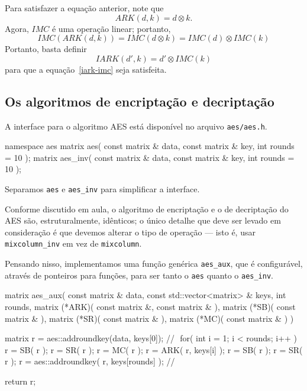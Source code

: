 \documentclass{article}
\newcommand{\xor}{\otimes}
\begin{document}
Para satisfazer a equação anterior, note que
\begin{equation*}
    ARK( d, k ) = d \xor k.
\end{equation*}
Agora, $IMC$ é uma operação linear; portanto,
\begin{equation*}
    IMC( ARK(d, k) ) = IMC( d \xor k ) = IMC(d) \xor IMC(k)
\end{equation*}
Portanto, basta definir
\begin{equation*}
    IARK( d', k ) = d' \xor IMC(k)
\end{equation*}
para que a equação~\ref{iark-imc} seja satisfeita.

\subsection{Os algoritmos de encriptação e decriptação}

A interface para o algoritmo AES está disponível no arquivo \verb"aes/aes.h".
\begin{cppcode}
    namespace aes {
        matrix aes( const matrix & data, const matrix & key, int rounds = 10 );
        matrix aes_inv( const matrix & data, const matrix & key, int rounds = 10 );
    }
\end{cppcode}

Separamos \verb"aes" e \verb"aes_inv" para simplificar a interface.

Conforme discutido em aula, o algoritmo de encriptação e o de decriptação do AES
são, estruturalmente, idênticos;
o único detalhe que deve ser levado em consideração
é que devemos alterar o tipo de operação
--- isto é, usar \verb"mixcolumn_inv" em vez de \verb"mixcolumn".

Pensando nisso,
implementamos uma função genérica \verb"aes_aux",
que é configurável, através de ponteiros para funções,
para ser tanto o \verb"aes" quanto o \verb"aes_inv".

\begin{cppcode}
    matrix aes_aux(
        const matrix & data,
        const std::vector<matrix> & keys,
        int rounds,
        matrix (*ARK)( const matrix &, const matrix & ),
        matrix (*SB)( const matrix & ),
        matrix (*SR)( const matrix & ),
        matrix (*MC)( const matrix & )
    )
    {
        matrix r = aes::addroundkey(data, keys[0]); // $\label{linha1}$
        for( int i = 1; i < rounds; i++ ) {
            r = SB( r );
            r = SR( r );
            r = MC( r );
            r = ARK( r, keys[i] );
        }
        r = SB( r );
        r = SR( r );
        r = aes::addroundkey( r, keys[rounds] ); // $\label{linha2}$

        return r;
    }
\end{cppcode}
\end{document}
